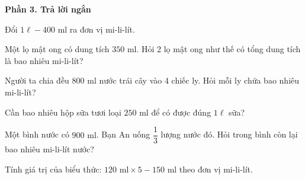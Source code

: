 \textbf{Phần 3. Trả lời ngắn}

\begin{ex} %
Đổi $1\ell - 400\text{ ml}$ ra đơn vị mi-li-lít.
\end{ex}

\begin{ex} %
Một lọ mật ong có dung tích $350\text{ ml}$. Hỏi 2 lọ mật ong như thế có tổng dung tích là bao nhiêu mi-li-lít?
\end{ex}

\begin{ex} %
Người ta chia đều $800\text{ ml}$ nước trái cây vào 4 chiếc ly. Hỏi mỗi ly chứa bao nhiêu mi-li-lít?
\end{ex}

\begin{ex} %
Cần bao nhiêu hộp sữa tươi loại $250\text{ ml}$ để có được đúng $1\ell$ sữa?
\end{ex}

\begin{ex} %
Một bình nước có $900\text{ ml}$. Bạn An uống $\dfrac{1}{3}$ lượng nước đó. Hỏi trong bình còn lại bao nhiêu mi-li-lít nước?
\end{ex}

\begin{ex} %
Tính giá trị của biểu thức: $120\text{ ml} \times 5 - 150\text{ ml}$ theo đơn vị mi-li-lít.
\end{ex}
